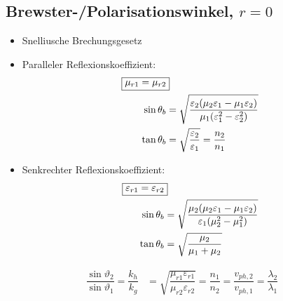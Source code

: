 \subsection{Brewster-/Polarisationswinkel, $r=0$}
\begin{itemize}
    \item Snelliusche Brechungsgesetz
    \item Paralleler Reflexionskoeffizient:
          \begin{align*}
              \Aboxed{\mu_{r1}=\mu_{r2}}                                                                                                    \\
              \sin\theta_b & = \sqrt{\frac{\varepsilon_2(\mu_2\varepsilon_1 - \mu_1\varepsilon_2)}{\mu_1(\varepsilon_1^2-\varepsilon_2^2)}} \\
              \tan\theta_b & = \sqrt{\frac{\varepsilon_2}{\varepsilon_1}} = \frac{n_2}{n_1}
          \end{align*}

    \item Senkrechter Reflexionskoeffizient:
          \begin{align*}
              \Aboxed{\varepsilon_{r1}=\varepsilon_{r2}}                                                                    \\
              \sin\theta_b & = \sqrt{\frac{\mu_2(\mu_2\varepsilon_1 - \mu_1\varepsilon_2)}{\varepsilon_1(\mu_2^2-\mu_1^2)}} \\
              \tan\theta_b & = \sqrt{\frac{\mu_2}{\mu_1+\mu_2}}
          \end{align*}
\end{itemize}

\begin{align*}
    \dfrac{\sin \vartheta_{2}}{\sin \vartheta_{1}} = \dfrac{k_{h}}{k_{g}} & = \sqrt{\dfrac{\mu_{r 1} \varepsilon_{r 1}}{\mu_{r 2} \varepsilon_{r 2}}} = \dfrac{n_{1}}{n_{2}} = \dfrac{v_{p h, 2}}{v_{p h, 1}} = \dfrac{\lambda_{2}}{\lambda_{1}} \\
\end{align*}
\newpage
